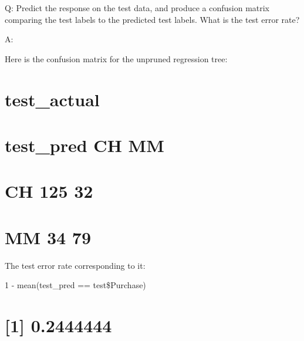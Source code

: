 \documentclass[
]{book}
\newenvironment{Shaded}{\begin{snugshade}}{\end{snugshade}}
\newcommand{\AttributeTok}[1]{\textcolor[rgb]{0.77,0.63,0.00}{#1}}
\newcommand{\CommentTok}[1]{\textcolor[rgb]{0.56,0.35,0.01}{\textit{#1}}}
\newcommand{\FunctionTok}[1]{\textcolor[rgb]{0.00,0.00,0.00}{#1}}
\newcommand{\NormalTok}[1]{#1}
\newcommand{\OtherTok}[1]{\textcolor[rgb]{0.56,0.35,0.01}{#1}}
\newcommand{\SpecialCharTok}[1]{\textcolor[rgb]{0.00,0.00,0.00}{#1}}
\newcommand{\StringTok}[1]{\textcolor[rgb]{0.31,0.60,0.02}{#1}}
\begin{document}
Q: Predict the response on the test data, and produce a confusion matrix comparing the test labels to the predicted test labels. What is the test error rate?

A:

Here is the confusion matrix for the unpruned regression tree:

\begin{Shaded}
\end{Shaded}

\hypertarget{test_actual}{%
\section{test\_actual}\label{test_actual}}

\hypertarget{test_pred-ch-mm}{%
\section{test\_pred CH MM}\label{test_pred-ch-mm}}

\hypertarget{ch-125-32}{%
\section{CH 125 32}\label{ch-125-32}}

\hypertarget{mm-34-79}{%
\section{MM 34 79}\label{mm-34-79}}

The test error rate corresponding to it:

1 - mean(test\_pred == test\$Purchase)

\hypertarget{section}{%
\section{{[}1{]} 0.2444444}\label{section}}
\end{document}
